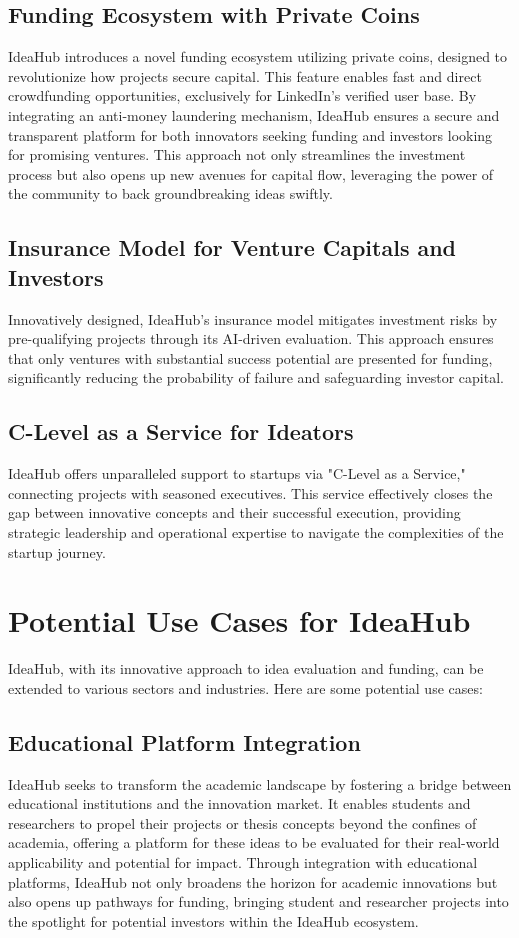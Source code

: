 \documentclass{article}
\begin{document}
	
	\subsection{Funding Ecosystem with Private Coins}
	IdeaHub introduces a novel funding ecosystem utilizing private coins, designed to revolutionize how projects secure capital. This feature enables fast and direct crowdfunding opportunities, exclusively for LinkedIn's verified user base. By integrating an anti-money laundering mechanism, IdeaHub ensures a secure and transparent platform for both innovators seeking funding and investors looking for promising ventures. This approach not only streamlines the investment process but also opens up new avenues for capital flow, leveraging the power of the community to back groundbreaking ideas swiftly.
	
	
	\subsection{Insurance Model for Venture Capitals and Investors}
	Innovatively designed, IdeaHub's insurance model mitigates investment risks by pre-qualifying projects through its AI-driven evaluation. This approach ensures that only ventures with substantial success potential are presented for funding, significantly reducing the probability of failure and safeguarding investor capital.
	
	\subsection{C-Level as a Service for Ideators}
	IdeaHub offers unparalleled support to startups via "C-Level as a Service," connecting projects with seasoned executives. This service effectively closes the gap between innovative concepts and their successful execution, providing strategic leadership and operational expertise to navigate the complexities of the startup journey.
	
	\section{Potential Use Cases for IdeaHub}
	IdeaHub, with its innovative approach to idea evaluation and funding, can be extended to various sectors and industries. Here are some potential use cases:
	
	\subsection{Educational Platform Integration}
	IdeaHub seeks to transform the academic landscape by fostering a bridge between educational institutions and the innovation market. It enables students and researchers to propel their projects or thesis concepts beyond the confines of academia, offering a platform for these ideas to be evaluated for their real-world applicability and potential for impact. Through integration with educational platforms, IdeaHub not only broadens the horizon for academic innovations but also opens up pathways for funding, bringing student and researcher projects into the spotlight for potential investors within the IdeaHub ecosystem.
	
\end{document}
